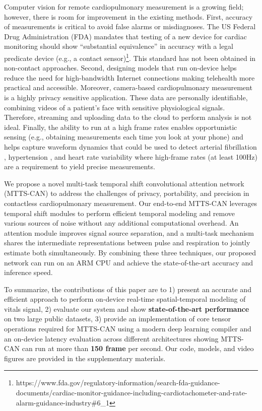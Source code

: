 \documentclass{article}
\begin{document}
Computer vision for remote cardiopulmonary measurement is a growing field; however, there is room for improvement in the existing methods. First, accuracy of measurements is critical to avoid false alarms or misdiagnoses. The US Federal Drug Administration (FDA) mandates that testing of a new device for cardiac monitoring should show ``substantial equivalence'' in accuracy with a legal predicate device (e.g., a contact sensor)\footnote{https://www.fda.gov/regulatory-information/search-fda-guidance-documents/cardiac-monitor-guidance-including-cardiotachometer-and-rate-alarm-guidance-industry\#6\_1}. This standard has not been obtained in non-contact approaches. Second, designing models that run on-device helps reduce the need for high-bandwidth Internet connections making telehealth more practical and accessible. Moreover, camera-based cardiopulmonary measurement is a highly privacy sensitive application. These data are personally identifiable, combining videos of a patient's face with sensitive physiological signals. Therefore, streaming and uploading data to the cloud to perform analysis is not ideal. Finally, the ability to run at a high frame rates enables opportunistic sensing (e.g., obtaining measurements each time you look at your phone) and helps capture waveform dynamics that could be used to detect arterial fibrillation \cite{chan2016diagnostic}, hypertension \cite{hosanee2020cuffless}, and heart rate variability \cite{mcduff2014remote} where high-frame rates (at least 100Hz) are a requirement to yield precise measurements. 

We propose a novel multi-task temporal shift convolutional attention network (MTTS-CAN) to address the challenges of privacy, portability, and precision in contactless cardiopulmonary measurement. Our end-to-end MTTS-CAN leverages temporal shift modules to perform efficient temporal modeling and remove various sources of noise without any additional computational overhead. An attention module improves signal source separation, and a multi-task mechanism shares the intermediate representations between pulse and respiration to jointly estimate both simultaneously. By combining these three techniques, our proposed network can run on an ARM CPU and achieve the state-of-the-art accuracy and inference speed. 

To summarize, the contributions of this paper are to 1) present an accurate and efficient approach to perform on-device real-time spatial-temporal modeling of vitals signal, 2) evaluate our system and show \textbf{state-of-the-art performance} on two large public datasets, 3) provide an implementation of core tensor operations required for MTTS-CAN using a modern deep learning compiler and an on-device latency evaluation across different architectures showing MTTS-CAN can run at more than \textbf{150 frame} per second. Our code, models, and video figures are provided in the supplementary materials.
\end{document}
